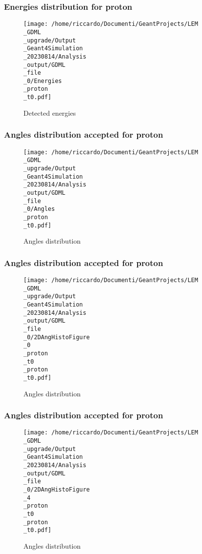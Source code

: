 \documentclass[8pt]{beamer}
\begin{document}
            \begin{frame}
                \frametitle{Energies distribution for proton}
            
        \begin{figure}[h]
            \centering
            \texttt{[image: /home/riccardo/Documenti/GeantProjects/LEM\\\_GDML\\\_upgrade/Output\\\_Geant4Simulation\\\_20230814/Analysis\\\_output/GDML\\\_file\\\_0/Energies\\\_proton\\\_t0.pdf]}
            \caption{Detected energies}
        \end{figure}
        
            \end{frame}
            
            \begin{frame}
                \frametitle{Angles distribution accepted for proton}
            
        \begin{figure}[h]
            \centering
            \texttt{[image: /home/riccardo/Documenti/GeantProjects/LEM\\\_GDML\\\_upgrade/Output\\\_Geant4Simulation\\\_20230814/Analysis\\\_output/GDML\\\_file\\\_0/Angles\\\_proton\\\_t0.pdf]}
            \caption{Angles distribution}
        \end{figure}
        
            \end{frame}
            
            \begin{frame}
                \frametitle{Angles distribution accepted for proton}
            
        \begin{figure}[h]
            \centering
            \texttt{[image: /home/riccardo/Documenti/GeantProjects/LEM\\\_GDML\\\_upgrade/Output\\\_Geant4Simulation\\\_20230814/Analysis\\\_output/GDML\\\_file\\\_0/2DAngHistoFigure\\\_0\\\_proton\\\_t0\\\_proton\\\_t0.pdf]}
            \caption{Angles distribution}
        \end{figure}
        
            \end{frame}
            
            \begin{frame}
                \frametitle{Angles distribution accepted for proton}
            
        \begin{figure}[h]
            \centering
            \texttt{[image: /home/riccardo/Documenti/GeantProjects/LEM\\\_GDML\\\_upgrade/Output\\\_Geant4Simulation\\\_20230814/Analysis\\\_output/GDML\\\_file\\\_0/2DAngHistoFigure\\\_4\\\_proton\\\_t0\\\_proton\\\_t0.pdf]}
            \caption{Angles distribution}
        \end{figure}
        
            \end{frame}
            
\end{document}
